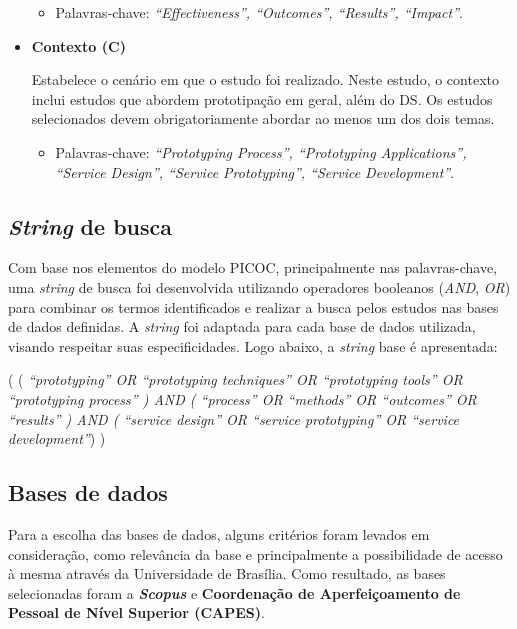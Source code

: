 \begin{itemize}
	\begin{itemize}
		\item Palavras-chave:\textit{ ``Effectiveness'', ``Outcomes'', ``Results'', ``Impact''}.
	\end{itemize} 
	
	\item \textbf{Contexto (C)}
	
	Estabelece o cenário em que o estudo foi realizado.
	Neste estudo, o contexto inclui estudos que abordem prototipação em geral, além do DS. Os estudos selecionados devem obrigatoriamente abordar ao menos um dos dois temas.
	
	\begin{itemize}
		\item Palavras-chave: \textit{``Prototyping Process'', ``Prototyping Applications'', ``Service Design'', ``Service Prototyping'', ``Service Development''}.
	\end{itemize}
	
\end{itemize}

\subsection{\textit{String} de busca}

Com base nos elementos do modelo PICOC, principalmente nas palavras-chave, uma \textit{string} de busca foi desenvolvida utilizando operadores booleanos (\textit{AND}, \textit{OR}) para combinar os termos identificados e realizar a busca pelos estudos nas bases de dados definidas. A \textit{string} foi adaptada para cada base de dados utilizada, visando respeitar suas especificidades. Logo abaixo, a \textit{string} base é apresentada:

( (\textit{ ``prototyping'' OR ``prototyping techniques'' OR ``prototyping tools'' OR ``prototyping process'' ) AND ( ``process'' OR ``methods'' OR ``outcomes'' OR ``results'' ) AND ( ``service design'' OR ``service prototyping'' OR ``service development''}) )

\subsection{Bases de dados}

Para a escolha das bases de dados, alguns critérios foram levados em consideração, como relevância da base e principalmente a possibilidade de acesso à mesma através da Universidade de Brasília. Como resultado, as bases selecionadas foram a \textbf{\textit{Scopus}} e \textbf{Coordenação de Aperfeiçoamento de Pessoal de Nível Superior (CAPES)}.

